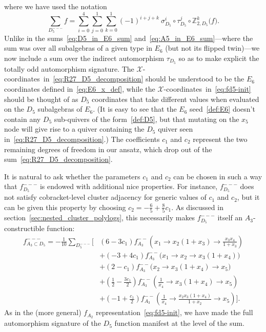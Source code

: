 \documentclass[12pt]{article}
\def\nl{\nonumber\\}
\def\xcoords{$\mathcal{X}$-coordinates}
\begin{document}
where we have used the notation
\begin{equation}
	\sum_{D_5^{---}} f = \sum_{i=0}^4\sum_{j=0}^1\sum_{k=0}^1 (-1)^{i+j+k}\  \sigma_{D_5}^i \circ \tau_{D_5}^j \circ \mathbb{Z}_{2,D_5}^k \big(f\big).
\end{equation}
Unlike in the sums~\eqref{eq:D5_in_E6_sum} and~\eqref{eq:A5_in_E6_sum}---where the sum was over all subalgebras of a given type in $E_6$ (but not its flipped twin)---we now include a sum over the indirect automorphism $\tau_{D_5}$ so as to make explicit the totally odd automorphism signature. The \xcoords\ in~\eqref{eq:R27_D5_decomposition} should be understood to be the $E_6$ coordinates defined in~\eqref{eq:E6_x_def}, while the \xcoords\ in~\eqref{eq:fd5-init} should be thought of as $D_5$ coordinates that take different values when evaluated on the $D_5$ subalgebras of $E_6$. (It is easy to see that the $E_6$ seed~\eqref{def:E6} doesn't contain any $D_5$ sub-quivers of the form~\eqref{def:D5}, but that mutating on the $x_5$ node will give rise to a quiver containing the $D_5$ quiver seen in~\eqref{eq:R27_D5_decomposition}.) The coefficients $c_1$ and $c_2$ represent the two remaining degrees of freedom in our ansatz, which drop out of the sum~\eqref{eq:R27_D5_decomposition}.

It is natural to ask whether the parameters $c_1$ and $c_2$ can be chosen in such a way that $f_{D_5}^{---}$ is endowed with additional nice properties. For instance, $f_{D_5}^{---}$ does not satisfy cobracket-level cluster adjacency for generic values of $c_1$ and $c_2$, but it can be given this property by choosing $c_2 = -\frac{6}{5} + \frac{8}{5} c_1$. As discussed in section~\ref{sec:nested_cluster_polylogs}, this necessarily makes $f_{D_5}^{---}$ itself an $A_3$-constructible function:
\begin{align}
	f_{A_3\subset D_5}^{---} = - \frac{1}{10}\sum_{D_5^{---}}\bigg[ 
	&\left(6-3 c_1\right) f_{A_3}^{--}\left(x_1\to x_2 \left(1+x_3\right)\to \frac{x_3 x_4}{1+x_3}\right)  \nonumber \\[-.34cm]
	&+ \left(-3+4 c_1\right) f_{A_3}^{--}\big(x_1\to x_2\to x_3 \left(1+x_4\right)\big)  \nl
	&+ \left(2-c_1\right) f_{A_3}^{--}\big(x_2\to x_3 \left(1+x_4\right)\to x_5\big) \\
	&+ \left(\frac{1}{2}-\frac{3 c_1}{2}\right) f_{A_3}^{--}\left(\frac{1}{x_4}\to x_3 \left(1+x_4\right)\to x_5\right)  \nl
	&+ \left(-1+\frac{c_1}{2}\right) f_{A_3}^{--}\left(\frac{1}{x_4}\to \frac{x_2 x_3 \left(1+x_4\right)}{1+x_2}\to x_5\right) \bigg]. \nonumber
\end{align}
As in the (more general) $f_{A_2}$ representation~\eqref{eq:fd5-init}, we have made the full automorphism signature of the $D_5$ function manifest at the level of the sum. 
\end{document}
